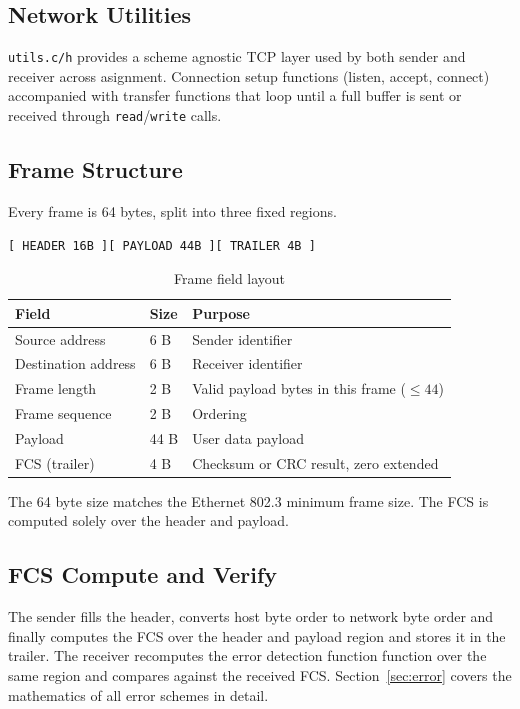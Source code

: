 \documentclass[10pt]{article}
\begin{document}
\subsection{Network Utilities}

\texttt{utils.c/h} provides a scheme agnostic TCP layer used by both
sender and receiver across asignment.  Connection setup functions (listen, accept,
connect) accompanied with transfer functions that loop until a full
buffer is sent or received through \texttt{read}/\texttt{write} calls.

\subsection{Frame Structure}

Every frame is 64 bytes, split into three fixed regions.

\begin{verbatim}
[ HEADER 16B ][ PAYLOAD 44B ][ TRAILER 4B ]
\end{verbatim}

\begin{table}[htbp]
\centering
\begin{tabular}{lll}
\toprule
Field & Size & Purpose \\
\midrule
Source address & 6 B & Sender identifier \\
Destination address & 6 B & Receiver identifier \\
Frame length & 2 B & Valid payload bytes in this frame ($\leq 44$) \\
Frame sequence & 2 B & Ordering \\
Payload & 44 B & User data payload \\
FCS (trailer) & 4 B & Checksum or CRC result, zero extended \\
\bottomrule
\end{tabular}
\caption{Frame field layout}
\end{table}

The 64 byte size matches the Ethernet 802.3 minimum frame size. The
FCS is computed solely over the header and payload.

\subsection{FCS Compute and Verify}

The sender fills the header, converts host byte order to network
byte order and finally computes the FCS over the header and payload region
and stores it in the trailer. The receiver recomputes the error detection function
function over the same region and compares against the received FCS. Section~\ref{sec:error} covers the mathematics of all error schemes in detail.
\end{document}
